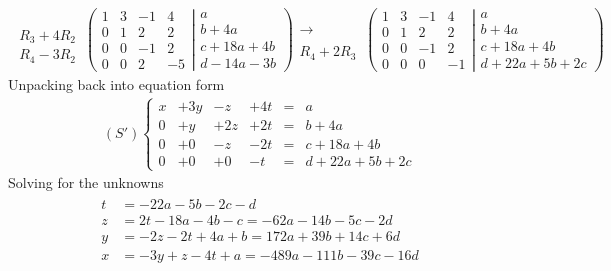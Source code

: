 \documentclass[usenames,dvipsnames,aspectratio=169,10pt]{beamer}
\numberwithin{equation}{section}
\begin{document}
\begin{frame}
\begin{align*}
\begin{array}{l}
   \\
   \\
 R_3 + 4R_2 \\
 R_4 - 3R_2
\end{array}
\,
\left(
	\begin{matrix}
	   1 &   3 & -1 &   4 \\
	   0 &   1 &  2 &   2 \\
	   0 &   0 & -1 &   2 \\
	   0 &   0 &  2 &  -5
	\end{matrix}
  \left|
	\begin{matrix}
	  a \\
	  b+4a \\
	  c+18a+4b \\
	  d-14a-3b
	\end{matrix}
  \right.
\right)
\begin{array}{l}
   \\
 \longrightarrow  \\
   \\
 R_4 + 2R_3
\end{array}
\,
\left(
	\begin{matrix}
	   1 &   3 & -1 &   4 \\
	   0 &   1 &  2 &   2 \\
	   0 &   0 & -1 &   2 \\
	   0 &   0 &  0 &  -1
	\end{matrix}
  \left|
	\begin{matrix}
	  a \\
	  b+4a \\
	  c+18a+4b \\
	  d+22a+5b+2c
	\end{matrix}
  \right.
\right)
\end{align*}
Unpacking back into equation form \vspace{-0.3cm}
\begin{align*}
(S')
\left\{
\begin{matrix}
    x &+ 3y &-  z &+ 4t &=&  a \\
    0 &+  y &+ 2z &+ 2t &=&  b+4a \\
    0 &+  0 &-  z &- 2t &=&  c+18a+4b \\
    0 &+  0 &+  0 &-  t &=&  d+22a+5b+2c
\end{matrix}
\right.
\end{align*}
Solving for the unknowns \vspace{-0.3cm}
\begin{align*}
\begin{array}{ll}
   t &=  -22a-5b-2c -d\\
   z &=  2t -18a-4b-c  = -62a-14b-5c-2d\\
   y &=  -2z - 2t +4a+b = 172a+39b+14c+6d\\
   x &= -3y + z - 4t + a = -489a - 111b-39c-16d 	
\end{array}
\end{align*}


\end{frame}
\end{document}
